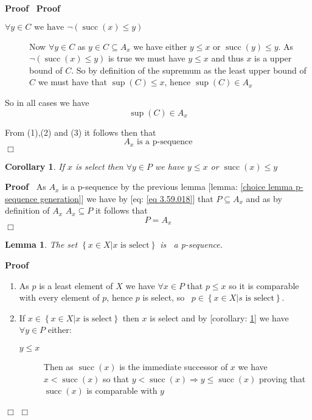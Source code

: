 \documentclass{book}
\newcommand{\tmop}[1]{\ensuremath{\operatorname{#1}}}
\newenvironment{proof}{\noindent\textbf{Proof\ }}{\hspace*{\fill}$\Box$\medskip}
\newtheorem{corollary}{Corollary}
\newtheorem{lemma}{Lemma}
\begin{document}
\begin{proof}
\begin{proof}
\begin{enumerate}
\begin{description}
        \item[$\forall y \in C \text{ we have } \neg (\tmop{succ} (x)
        \leqslant y)$] Now $\forall y \in C$ as $y \in C \subseteq A_x$ we
        have either $y \leqslant x$ or $\tmop{succ} (y) \leqslant y$. As $\neg
        (\tmop{succ} (x) \leqslant y)$ is true we must have $y \leqslant x$
        and thus $x$ is a upper bound of $C$. So by definition of the supremum
        as the least upper bound of $C$ we must have that $\sup (C) \leqslant
        x$, hence $\sup (C) \in A_x$
      \end{description}
      So in all cases we have
      \[ \sup (C) \in A_x \]
    \end{enumerate}
    From (1),(2) and (3) it follows then that
    \[ A_x \text{ is a p-sequence} \]
  \end{proof}
  
  \begin{corollary}
    \label{choice lemma properties of select}If $x$ is select then $\forall y
    \in P$ we have $y \leqslant x$ or $\tmop{succ} (x) \leqslant y$
  \end{corollary}
  
  \begin{proof}
    As $A_x$ is a p-sequence by the previous lemma [lemma: \ref{choice lemma
    p-sequence generation}] we have by [eq: \ref{eq 3.59.018}] that $P
    \subseteq A_x$ and as by definition of $A_x$ $A_x \subseteq P$ it follows
    that
    \[ P = A_x \]
  \end{proof}
  
  \begin{lemma}
    \label{choice lemma select elements froms a p-sewuence}The set $\left\{ x
    \in X|x \text{ is select} \right\}$ is \ a p-sequence.
  \end{lemma}
  
  \begin{proof}
    
    \begin{enumerate}
      \item As $p$ is a least element of $X$ we have $\forall x \in P$ that $p
      \leqslant x$ so it is comparable with every element of $p$, hence $p$ is
      select, so \ $p \in \left\{ x \in X|s \text{ is select} \right\}$.
      
      \item If $x \in \left\{ x \in X|x \text{ is select} \right\}$ then $x$
      is select and by [corollary: \ref{choice lemma properties of select}] we
      have $\forall y \in P$ either:
      \begin{description}
        \item[$y \leqslant x$] Then as $\tmop{succ} (x)$ is the immediate
        successor of $x$ we have $x < \tmop{succ} (x)$ so that $y <
        \tmop{succ} (x) \Rightarrow y \leqslant \tmop{succ} (x)$ proving that
        $\tmop{succ} (x)$ is comparable with $y$
        

\end{description}
\end{enumerate}
\end{proof}
\end{proof}
\end{document}
